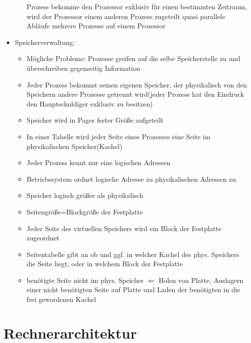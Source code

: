 \documentclass[10pt,a5paper]{article}
\begin{document}
\begin{itemize}
\begin{itemize}
\subitem Prozess bekomme den Prozessor exklusiv für einen bestimmten Zeitraum, wird der Prozessor einem anderen Prozess zugeteilt
\subitem quasi parallele Abläufe mehrere Prozesse auf einem Prozessor
\end{itemize}
\item Speicherverwaltung:\begin{itemize}
\item Mögliche Probleme: Prozesse greifen auf die selbe Speicherstelle zu und überschreiben gegenseitig Information
\item Jeder Prozess bekommt seinen eigenen Speicher, der physikalisch von den Speichern andere Prozesse getrennt wird(jeder Prozess hat den Eindruck den Hauptschuldiger exklusiv zu besitzen)
\item Speicher wird in Pages fester Größe aufgeteilt
\item In einer Tabelle wird jeder Seite eines Prozesses eine Seite im physikalischen Speicher(Kachel)
\item Jeder Prozess kennt nur eine logischen Adressen
\item Betriebssystem ordnet logische Adresse zu physikalischen Adressen zu
\item Speicher logisch größer als physikalisch
\item Seitengröße=Blockgröße der Festplatte
\item Jeder Seite des virtuellen Speichers wird ein Block der Festplatte zugeordnet
\item Seitentabelle gibt an ob und ggf. in welcher Kachel des phys. Speichers die Seite liegt, oder in welchem Block der Festplatte
\item benötigte Seite nicht im phys. Speicher \ensuremath{\Leftarrow} Holen von Platte, Auslagern einer nicht benötigten Seite auf Platte und Laden der benötigten in die frei gewordenen Kachel
\end{itemize}
\end{itemize}
\section{Rechnerarchitektur}
\end{document}
